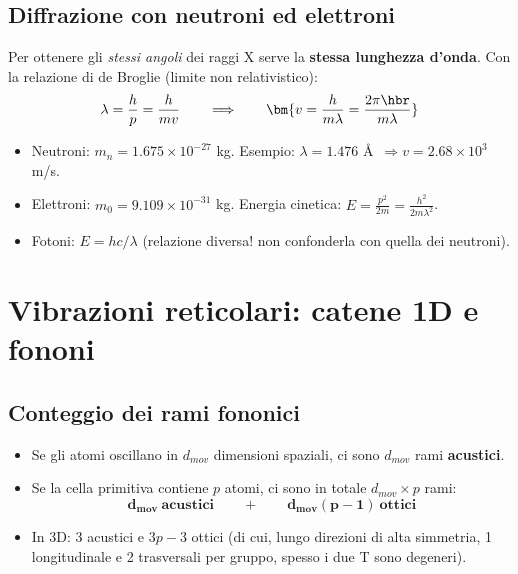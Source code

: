 \subsection{Diffrazione con neutroni ed elettroni}
Per ottenere gli \emph{stessi angoli} dei raggi X serve la \textbf{stessa lunghezza d'onda}. Con la relazione di de Broglie (limite non relativistico):
\[ \lambda = \frac{h}{p} = \frac{h}{m v} \qquad\Longrightarrow\qquad
   \bm{v = \frac{h}{m\lambda} = \frac{2\pi\hbr}{m\lambda}} \]
\begin{itemize}
  \item Neutroni: $m_n = 1.675\times10^{-27}$ kg. Esempio: $\lambda = 1.476$ \AA\ $\Rightarrow v = 2.68\times10^3$ m/s.
  \item Elettroni: $m_0 = 9.109\times10^{-31}$ kg. Energia cinetica: $E = \frac{p^2}{2m} = \frac{h^2}{2m\lambda^2}$.
  \item Fotoni: $E = hc/\lambda$ (relazione diversa! non confonderla con quella dei neutroni).
\end{itemize}

\newpage

\section{Vibrazioni reticolari: catene 1D e fononi}

\subsection{Conteggio dei rami fononici}
\begin{itemize}
  \item Se gli atomi oscillano in $d_{mov}$ dimensioni spaziali, ci sono $d_{mov}$ rami \textbf{acustici}.
  \item Se la cella primitiva contiene $p$ atomi, ci sono in totale $d_{mov}\times p$ rami:
  \[ \bm{d_{mov}\ \text{acustici} \qquad + \qquad d_{mov}(p-1)\ \text{ottici}} \]
  \item In 3D: 3 acustici e $3p-3$ ottici (di cui, lungo direzioni di alta simmetria, 1 longitudinale e 2 trasversali per gruppo, spesso i due T sono degeneri).
\end{itemize}


